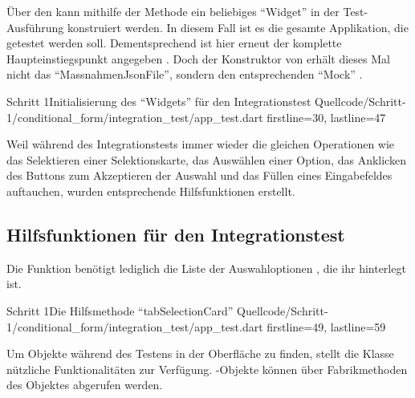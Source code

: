 \clearpage
Über den  kann mithilfe der Methode  ein beliebiges \enquote{Widget} in der Test-Ausführung konstruiert werden.
In diesem Fall ist es die gesamte Applikation, die getestet werden soll.
Dementsprechend ist  hier erneut der komplette Haupteinstiegspunkt angegeben \Lst{\ref{lst:Schritt1IntegrationsTestWidgetInitialisierung}}.
Doch der Konstruktor von  erhält dieses Mal nicht das \enquote{MassnahmenJsonFile}, sondern den entsprechenden \enquote{Mock} . 

\begin{alexlisting}{Schritt 1}{Initialisierung des \enquote{Widgets} für den Integrationstest}
  {Quellcode/Schritt-1/conditional_form/integration_test/app_test.dart}
  {firstline=30, lastline=47}
  \label{lst:Schritt1IntegrationsTestWidgetInitialisierung}
\end{alexlisting}


Weil während des Integrationstests immer wieder die gleichen Operationen wie das Selektieren einer Selektionskarte,
das Auswählen einer Option,
das Anklicken des Buttons zum Akzeptieren der Auswahl und das Füllen eines Eingabefeldes auftauchen,
wurden entsprechende Hilfsfunktionen erstellt.

\subsection{Hilfsfunktionen für den Integrationstest}
\label{sec:HilfsfunktionenIntegrationstest}



Die Funktion  \Lst{\ref{lst:Schritt1HilfsmethodeTabSelectionCard}} benötigt lediglich die Liste der Auswahloptionen , die ihr hinterlegt ist.
 

\begin{alexlisting}{Schritt 1}{Die Hilfsmethode \enquote{tabSelectionCard}}
  {Quellcode/Schritt-1/conditional_form/integration_test/app_test.dart}
  {firstline=49, lastline=59}
  \label{lst:Schritt1HilfsmethodeTabSelectionCard}
\end{alexlisting}

Um Objekte während des Testens in der Oberfläche zu finden, stellt die Klasse  nützliche Funktionalitäten zur Verfügung.
-Objekte können über Fabrikmethoden des Objektes  abgerufen werden.

